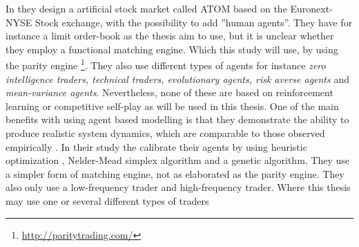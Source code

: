 \documentclass{kththesis}
\theoremstyle{definition}
\begin{document}
In \textcite{brandouy2011design} they design a artificial stock market called ATOM based on the Euronext-NYSE Stock exchange, with the possibility to add ''human agents''. They have for instance a limit order-book as the thesis aim to use, but it is unclear whether they employ a functional matching engine. Which this study will use, by using the parity engine \footnote{\url{http://paritytrading.com/}}. They also use different types of agents for instance \textit{zero intelligence traders, technical traders, evolutionary agents, risk averse agents} and \textit{mean-variance agents}. 
\newline
\newline
Nevertheless, none of these are based on reinforcement learning or competitive self-play as will be used in this thesis. One of the main benefits with using agent based modelling is that they demonstrate the ability to produce realistic system dynamics, which are comparable to those observed empirically \parencite{platt2016problem}. In their study the calibrate their agents by using heuristic optimization , Nelder-Mead simplex algorithm and a genetic algorithm. They use a simpler form of matching engine, not as elaborated as the parity engine. They also only use a low-frequency trader and high-frequency trader. Where this thesis may use one or several different types of traders
\end{document}
